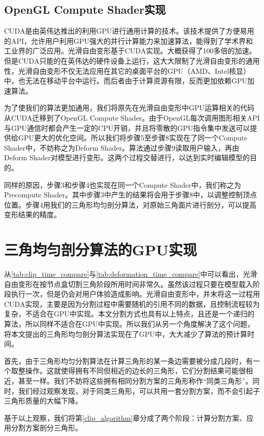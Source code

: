 \subsection{OpenGL Compute Shader实现}
CUDA是由英伟达推出的利用GPU进行通用计算的技术。该技术提供了方便易用的API，允许用户利用GPU强大的并行计算能力来加速算法，能得到了学术界和工业界的广泛应用。光滑自由变形\cite{Cui15}基于CUDA实现。大概获得了100多倍的加速。但是CUDA只能的在英伟达的硬件设备上运行，这大大限制了光滑自由变形的通用性，光滑自由变形不仅无法应用在其它的桌面平台的GPU（AMD、Intel核显）中，也无法在移动平台中运行。而后者由于计算资源有限，反而更加依赖GPU加速算法。

为了使我们的算法更加通用，我们将原先在光滑自由变形中GPU运算相关的代码从CUDA迁移到了OpenGL Compute Shader。由于OpenGL每次调用图形相关API与GPU通信时都会产生一定的CPU开销，并且将零散的GPU指令集中发送可以提供给GPU更大的优化空间。所以我们将步骤5至步骤8实现在了同一个Compute Shader中，不妨称之为Deform Shader。算法通过步骤9读取用户输入，再由Deform Shader对模型进行变形。这两个过程交替进行，以达到实时编辑模型的目的。

同样的原因，步骤3和步骤4也实现在同一个Compute Shader中，我们称之为Precompute Shader。其中步骤3中产生的结果将会用于步骤8中，以调整控制顶点位置。步骤4用我们的三角形均匀剖分算法，对原始三角面片进行剖分，可以提高变形结果的精度。


\section{三角均匀剖分算法的GPU实现}
从\autoref{tab:clip_time_compare}与\autoref{tab:deformation_time_compare}中可以看出，光滑自由变形在按节点盒切割三角阶段所用时间非常久。虽然该过程只要在模型载入阶段执行一次，但是仍会对用户体验造成影响。光滑自由变形中，并末将这一过程用CUDA实现，主要是因为分割过程中需要随机的引用不同的数据，且控制流程较为复杂，不适合在GPU中实现。本文分割方式也具有以上特点，且还是一个递归的算法，所以同样不适合在GPU中实现。所以我们从另一个角度解决了这个问题，将本文提出的三角形均匀剖分算法实现在了GPU中，大大减少了算法的预计算时间。

首先，由于三角形均匀分割算法在计算三角形的某一条边需要被分成几段时，有一个取整操作。这就使得拥有不同但相近的边长的三角形，它们分割结果可能很相近，甚至一样。我们不妨将这些拥有相同分割方案的三角形称作“同类三角形”。同时，我们经过观察发现，对于同类三角形，可以共用一套分割方案，而不会引起子三角形质量的大幅下降。

基于以上观察，我们将第\autoref{clip_algorithm}章分成了两个阶段：计算分割方案、应用分割方案剖分三角形。


